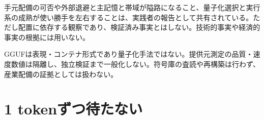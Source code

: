 \documentclass[lualatex,a4paper,10pt]{jlreq}
\begin{document}
\begin{communitynote}
手元配備の可否や外部退避と主記憶と帯域が隘路になること、量子化選択と実行系の成熟が使い勝手を左右することは、実践者の報告として共有されている\autocite{qwenpr,unslothglm}。ただし配置に依存する観察であり、検証済み事実とはしない。技術的事実や経済的事実の根拠には用いない。
\end{communitynote}

\begin{claimboundary}[本節の読解上の境界]
GGUFは表現・コンテナ形式であり量子化手法ではない。提供元測定の品質・速度数値は隔離し、独立検証まで一般化しない。符号庫の査読や再構築は行わず、産業配備の証拠としては扱わない。
\end{claimboundary}

\section{1 tokenずつ待たない}
\label{sec:decode}
\end{document}
